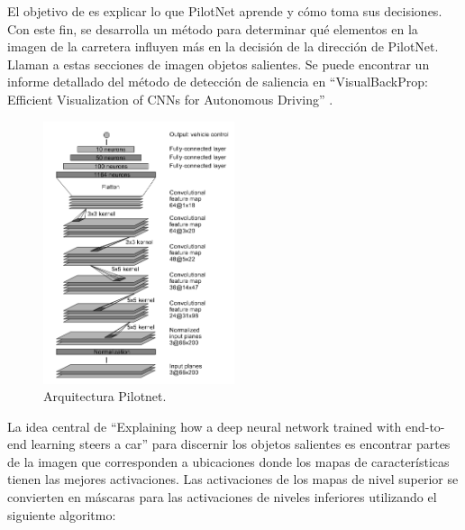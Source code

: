 El objetivo de \cite{explaining-end2end} es explicar lo que PilotNet aprende y cómo toma sus decisiones. Con este fin, se desarrolla un método para determinar qué elementos en la imagen de la carretera influyen más en la decisión de la dirección de PilotNet. Llaman a estas secciones de imagen objetos salientes. Se puede encontrar un informe detallado del método de detección de saliencia en ``VisualBackProp: Efficient Visualization of CNNs for Autonomous Driving'' \cite{visual}.\\

\begin{figure}
\begin{center}
	\includegraphics[width=0.5\textwidth]{figures/Estado_arte/pilotnet.png}
   \caption{Arquitectura Pilotnet.}
	\label{fig.pilotnet}
\end{center}
\end{figure}

La idea central de ``Explaining  how  a  deep  neural network trained with end-to-end learning steers a car'' \cite{explaining-end2end} para discernir los objetos salientes es encontrar partes de la imagen que corresponden a ubicaciones donde los mapas de características tienen las mejores activaciones. Las activaciones de los mapas de nivel superior se convierten en máscaras para las activaciones de niveles inferiores utilizando el siguiente algoritmo:

